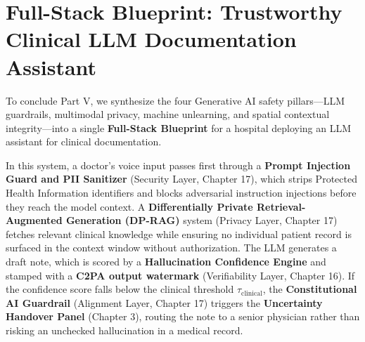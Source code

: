 \section{Full-Stack Blueprint: Trustworthy Clinical LLM Documentation Assistant}
\label{sec:blueprint_clinical_llm}

To conclude Part V, we synthesize the four Generative AI safety pillars---LLM guardrails, multimodal privacy, machine unlearning, and spatial contextual integrity---into a single \textbf{Full-Stack Blueprint} for a hospital deploying an LLM assistant for clinical documentation.

In this system, a doctor's voice input passes first through a \textbf{Prompt Injection Guard and PII Sanitizer} (Security Layer, Chapter 17), which strips Protected Health Information identifiers and blocks adversarial instruction injections before they reach the model context. A \textbf{Differentially Private Retrieval-Augmented Generation (DP-RAG)} system (Privacy Layer, Chapter 17) fetches relevant clinical knowledge while ensuring no individual patient record is surfaced in the context window without authorization. The LLM generates a draft note, which is scored by a \textbf{Hallucination Confidence Engine} and stamped with a \textbf{C2PA output watermark} (Verifiability Layer, Chapter 16). If the confidence score falls below the clinical threshold $\tau_{\text{clinical}}$, the \textbf{Constitutional AI Guardrail} (Alignment Layer, Chapter 17) triggers the \textbf{Uncertainty Handover Panel} (Chapter 3), routing the note to a senior physician rather than risking an unchecked hallucination in a medical record.

